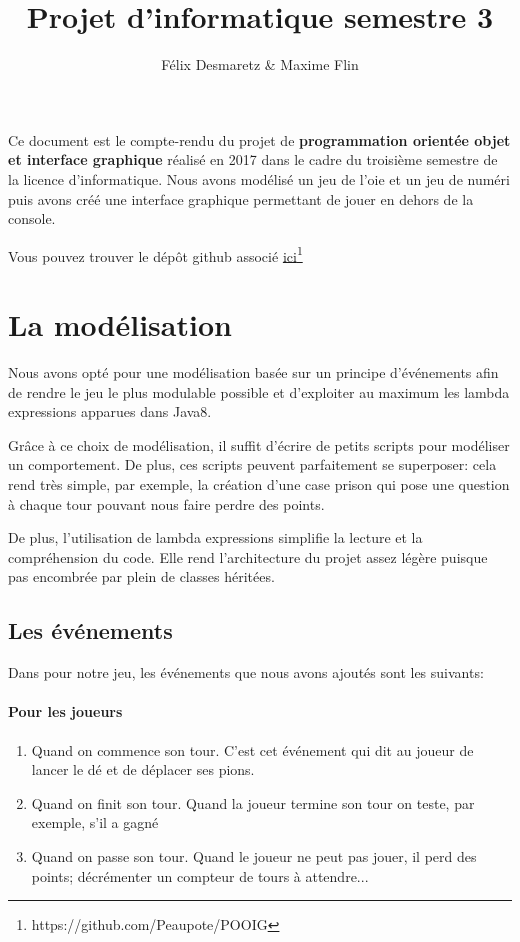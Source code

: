 \documentclass{article}
\title{Projet d'informatique semestre 3}
\author{Félix Desmaretz \& Maxime Flin}
\date{}
\begin{document}
\maketitle

Ce document est le compte-rendu du projet de \textbf{programmation orientée objet et interface graphique} réalisé en 2017 dans le cadre du troisième semestre de la licence d'informatique. Nous avons modélisé un jeu de l'oie et un jeu de numéri puis avons créé une interface graphique permettant de jouer en dehors de la console.

Vous pouvez trouver le dépôt github associé \href{https://github.com/Peaupote/POOIG}{ici\footnote{\href{https://github.com/Peaupote/POOIG}{https://github.com/Peaupote/POOIG}}}
\tableofcontents
\newpage

\section{La modélisation}
Nous avons opté pour une modélisation basée sur un principe d'événements afin de rendre le jeu le plus modulable possible et d'exploiter au maximum les lambda expressions apparues dans Java8. 

Grâce à ce choix de modélisation, il suffit d'écrire de petits scripts pour modéliser un comportement. De plus, ces scripts peuvent parfaitement se superposer: cela rend très simple, par exemple, la création d'une case prison qui pose une question à chaque tour pouvant nous faire perdre des points.

De plus, l'utilisation de lambda expressions simplifie la lecture et la compréhension du code. Elle rend l'architecture du projet assez légère puisque pas encombrée par plein de classes héritées.

\subsection{Les événements}

Dans pour notre jeu, les événements que nous avons ajoutés sont les suivants:
\paragraph{Pour les joueurs}
\begin{enumerate}
\item Quand on commence son tour. C'est cet événement qui dit au joueur de lancer le dé et de déplacer ses pions.
\item Quand on finit son tour. Quand la joueur termine son tour on teste, par exemple, s'il a gagné
\item Quand on passe son tour. Quand le joueur ne peut pas jouer, il perd des points; décrémenter un compteur de tours à attendre...
\end{enumerate}
\end{document}
